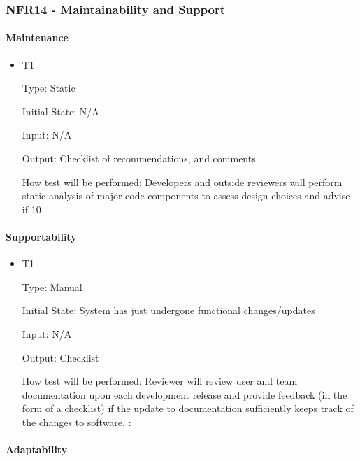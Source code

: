 \documentclass[12pt, titlepage]{article}
\begin{document}
\hypertarget{nfr14}{}
\subsubsection{NFR14 - Maintainability and Support}

\paragraph{Maintenance}

\begin{itemize}

\item{T1\\}

Type: Static

Initial State: N/A

Input: N/A

Output: Checklist of recommendations, and comments

How test will be performed: Developers and outside reviewers will perform static analysis of major code components to assess design choices and advise if 10%

\end{itemize}

\paragraph{Supportability}

\begin{itemize}

\item{T1\\}

Type: Manual

Initial State: System has just undergone functional changes/updates

Input: N/A

Output: Checklist

How test will be performed: Reviewer will review user and team documentation upon each development release and provide feedback (in the form of a checklist) if the update to documentation sufficiently keeps track of the changes to software.
:
\end{itemize}

\paragraph{Adaptability}
\end{document}
